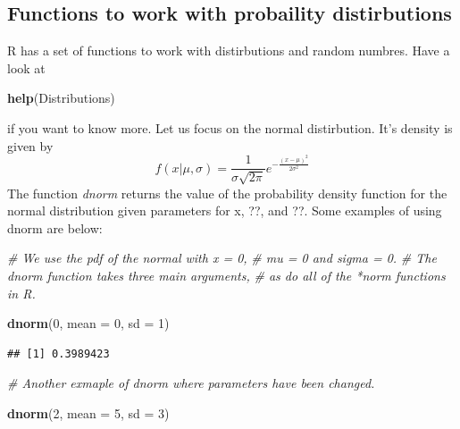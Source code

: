\documentclass[]{article}
\newenvironment{Shaded}{\begin{snugshade}}{\end{snugshade}}
\newcommand{\CommentTok}[1]{\textcolor[rgb]{0.56,0.35,0.01}{\textit{#1}}}
\newcommand{\DataTypeTok}[1]{\textcolor[rgb]{0.13,0.29,0.53}{#1}}
\newcommand{\DecValTok}[1]{\textcolor[rgb]{0.00,0.00,0.81}{#1}}
\newcommand{\KeywordTok}[1]{\textcolor[rgb]{0.13,0.29,0.53}{\textbf{#1}}}
\newcommand{\NormalTok}[1]{#1}
\begin{document}
\hypertarget{functions-to-work-with-probaility-distirbutions}{%
\subsection{Functions to work with probaility
distirbutions}\label{functions-to-work-with-probaility-distirbutions}}

R has a set of functions to work with distirbutions and random numbres.
Have a look at

\begin{Shaded}
\begin{Highlighting}[]
\KeywordTok{help}\NormalTok{(Distributions)}
\end{Highlighting}
\end{Shaded}

if you want to know more. Let us focus on the normal distirbution. It's
density is given by
\[f(x|\mu,\sigma) = \frac{1}{\sigma\sqrt{2\pi}}e^{-\frac{(x-\mu)^2}{2\sigma^2}}\]
The function \emph{dnorm} returns the value of the probability density
function for the normal distribution given parameters for x, ??, and ??.
Some examples of using dnorm are below:

\begin{Shaded}
\begin{Highlighting}[]
\CommentTok{# We use the pdf of the normal with x = 0, }
\CommentTok{# mu = 0 and sigma = 0. }
\CommentTok{# The dnorm function takes three main arguments, }
\CommentTok{# as do all of the *norm functions in R.}

\KeywordTok{dnorm}\NormalTok{(}\DecValTok{0}\NormalTok{, }\DataTypeTok{mean =} \DecValTok{0}\NormalTok{, }\DataTypeTok{sd =} \DecValTok{1}\NormalTok{)}
\end{Highlighting}
\end{Shaded}

\begin{verbatim}
## [1] 0.3989423
\end{verbatim}

\begin{Shaded}
\begin{Highlighting}[]
\CommentTok{# Another exmaple of dnorm where parameters have been changed.}

\KeywordTok{dnorm}\NormalTok{(}\DecValTok{2}\NormalTok{, }\DataTypeTok{mean =} \DecValTok{5}\NormalTok{, }\DataTypeTok{sd =} \DecValTok{3}\NormalTok{)}
\end{Highlighting}
\end{Shaded}
\end{document}
